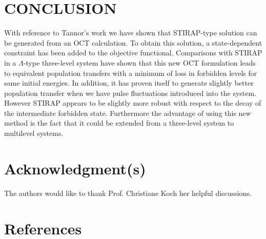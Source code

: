 \documentclass[]{interact}
\theoremstyle{plain}%
\theoremstyle{definition}
\theoremstyle{remark}
\begin{document}
\section{CONCLUSION}
With reference to Tannor's work \cite{Tannor} we have shown that 
STIRAP-type solution can be generated from an OCT calculation. To obtain this 
solution, a state-dependent constraint has been added to the objective 
functional. Comparisons with STIRAP in a $\Lambda$-type three-level 
system have shown that this new OCT formulation leads to equivalent 
population transfers with a minimum of loss in forbidden levels for same 
initial 
energies. In addition, it has proven itself to generate slightly better 
population transfer when we have pulse fluctuations introduced into the system. 
However STIRAP appears to be slightly more robust with respect to the decay 
of the intermediate forbidden state. 
Furthermore the advantage of using this new method is the fact that it could be 
extended from a three-level system to multilevel systems.   
\section*{Acknowledgment(s)}
The authors would like to thank Prof. Christiane Koch her helpful 
discussions.
\section*{References}
\end{document}
